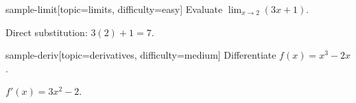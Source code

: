 \begin{problem}{sample-limit}[topic=limits, difficulty=easy]
	Evaluate $\displaystyle\lim_{x\to 2}(3x+1)$.
	\begin{solution}
	Direct substitution: $3(2)+1 = 7$.
	\end{solution}
\end{problem}

\begin{problem}{sample-deriv}[topic=derivatives, difficulty=medium]
	Differentiate $f(x) = x^3 - 2x$.
	\begin{solution}
	$f'(x) = 3x^2 - 2$.
	\end{solution}
\end{problem}

